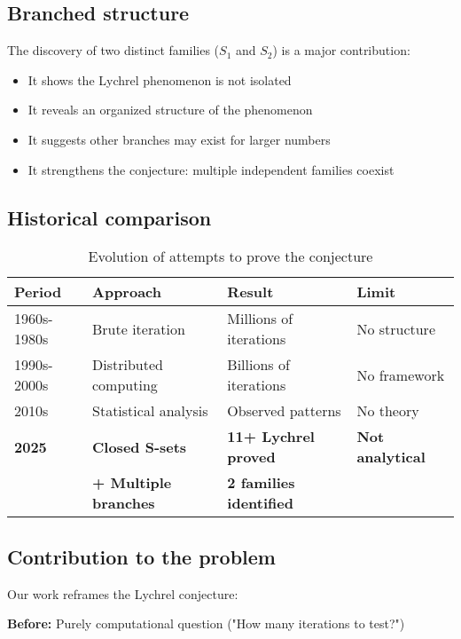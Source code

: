 \documentclass[12pt,a4paper]{article}
\theoremstyle{remark}
\begin{document}
\subsection{Branched structure}

The discovery of two distinct families ($S_1$ and $S_2$) is a major contribution:

\begin{itemize}
\item It shows the Lychrel phenomenon is not isolated
\item It reveals an organized structure of the phenomenon
\item It suggests other branches may exist for larger numbers
\item It strengthens the conjecture: multiple independent families coexist
\end{itemize}

\subsection{Historical comparison}

\begin{table}[h]
\centering
\caption{Evolution of attempts to prove the conjecture}
\begin{tabular}{llll}
\toprule
\textbf{Period} & \textbf{Approach} & \textbf{Result} & \textbf{Limit}\\
\midrule
1960s-1980s & Brute iteration & Millions of iterations & No structure\\
1990s-2000s & Distributed computing & Billions of iterations & No framework\\
2010s & Statistical analysis & Observed patterns & No theory\\
\textbf{2025} & \textbf{Closed S-sets} & \textbf{11+ Lychrel proved} & \textbf{Not analytical}\\
 & \textbf{+ Multiple branches} & \textbf{2 families identified} & \\
\bottomrule
\end{tabular}
\end{table}

\subsection{Contribution to the problem}

Our work reframes the Lychrel conjecture:

\textbf{Before:} Purely computational question ("How many iterations to test?")
\end{document}
